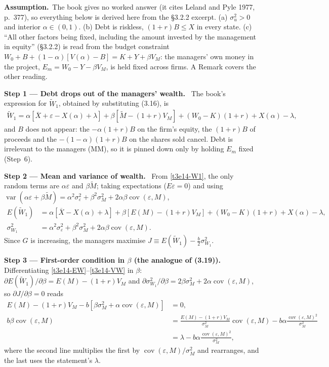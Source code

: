 \documentclass[11pt,a4paper]{article}
\newcommand{\step}[2]{\par\medskip\noindent\textbf{Step #1 --- #2.}~}
\newcommand{\assume}{\par\smallskip\noindent\textbf{Assumption.}~}
\begin{document}
\assume The book gives no worked answer (it cites Leland and Pyle 1977, p.~377), so everything below is
derived here from the \S3.2.2 excerpt. (a) $\sigma_u^2>0$ and interior $\alpha\in(0,1)$. (b) Debt is riskless,
$(1+r)B\le X$ in every state. (c) ``All other factors being fixed, including the amount invested by the
management in equity'' (\S3.2.2) is read from the budget constraint
$W_0+B+(1-\alpha)[V(\alpha)-B]=K+Y+\beta V_M$: the managers' own money in the project,
$E_m=W_0-Y-\beta V_M$, is held fixed across firms. A Remark covers the other reading.

\step{1}{Debt drops out of the managers' wealth} The book's expression for $\widetilde W_1$, obtained by
substituting (3.16), is
\begin{align}
  \widetilde W_1 = \alpha[\overline X+\varepsilon-X(\alpha)+\lambda]+\beta[\widetilde M-(1+r)V_M]+(W_0-K)(1+r)+X(\alpha)-\lambda, \label{t3e14-W1}
\end{align}
and $B$ does not appear: the $-\alpha(1+r)B$ on the firm's equity, the $(1+r)B$ of proceeds and the
$-(1-\alpha)(1+r)B$ on the shares sold cancel. Debt is irrelevant to the managers (MM), so it is pinned
down only by holding $E_m$ fixed (Step~6).

\step{2}{Mean and variance of wealth} From \eqref{t3e14-W1}, the only random terms are $\alpha\varepsilon$ and $\beta\widetilde M$; taking expectations ($E\varepsilon=0$) and using $\operatorname{var}(\alpha\varepsilon+\beta\widetilde M)=\alpha^2\sigma_\varepsilon^2+\beta^2\sigma_M^2+2\alpha\beta\operatorname{cov}(\varepsilon,M)$,
\begin{align}
  E(\widetilde W_1) &= \alpha[\overline X-X(\alpha)+\lambda]+\beta[E(M)-(1+r)V_M]+(W_0-K)(1+r)+X(\alpha)-\lambda, \label{t3e14-EW}\\
  \sigma^2_{W_1} &= \alpha^2\sigma_\varepsilon^2+\beta^2\sigma_M^2+2\alpha\beta\operatorname{cov}(\varepsilon,M). \label{t3e14-VW}
\end{align}
Since $G$ is increasing, the managers maximise $J\equiv E(\widetilde W_1)-\frac b2\sigma^2_{W_1}$.

\step{3}{First-order condition in $\beta$ (the analogue of (3.19))} Differentiating \eqref{t3e14-EW}--\eqref{t3e14-VW} in $\beta$: $\partial E(\widetilde W_1)/\partial\beta=E(M)-(1+r)V_M$ and $\partial\sigma^2_{W_1}/\partial\beta=2\beta\sigma_M^2+2\alpha\operatorname{cov}(\varepsilon,M)$, so $\partial J/\partial\beta=0$ reads
\begin{align}
  E(M)-(1+r)V_M-b[\beta\sigma_M^2+\alpha\operatorname{cov}(\varepsilon,M)] &= 0, \nonumber\\
  b\beta\operatorname{cov}(\varepsilon,M) &= \frac{E(M)-(1+r)V_M}{\sigma_M^2}\operatorname{cov}(\varepsilon,M)-b\alpha\frac{\operatorname{cov}(\varepsilon,M)^2}{\sigma_M^2} \nonumber\\
  &= \lambda-b\alpha\frac{\operatorname{cov}(\varepsilon,M)^2}{\sigma_M^2}, \label{t3e14-beta}
\end{align}
where the second line multiplies the first by $\operatorname{cov}(\varepsilon,M)/\sigma_M^2$ and rearranges, and the
last uses the statement's $\lambda$.
\end{document}
